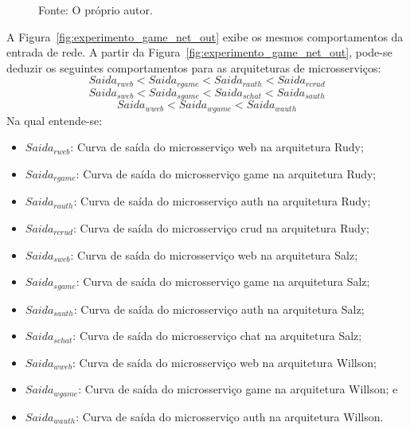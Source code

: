 \begin{figure}[htb!]
    Fonte: O próprio autor.
\end{figure}

A Figura~\ref{fig:experimento_game_net_out} exibe os mesmos comportamentos da entrada de rede.
%
A partir da Figura~\ref{fig:experimento_game_net_out}, pode-se deduzir os seguintes comportamentos para as arquiteturas de microsserviços:
\vspace{-0.3cm}
$$
     Saida_{rweb} < Saida_{rgame} < Saida_{rauth} < Saida_{rcrud}
$$
$$
     Saida_{sweb} < Saida_{sgame} < Saida_{schat} < Saida_{sauth}
$$
$$
     Saida_{wweb} < Saida_{wgame} < Saida_{wauth}
$$
\vspace{-0.3cm}
Na qual entende-se:
\vspace{-0.3cm}
\begin{itemize}
 \item $Saida_{rweb}$: Curva de saída do microsserviço web na arquitetura Rudy;
 \item $Saida_{rgame}$: Curva de saída do microsserviço game na arquitetura Rudy;
 \item $Saida_{rauth}$: Curva de saída do microsserviço auth na arquitetura Rudy;
 \item $Saida_{rcrud}$: Curva de saída do microsserviço crud na arquitetura Rudy;
  \item $Saida_{sweb}$: Curva de saída do microsserviço web na arquitetura Salz;
 \item $Saida_{sgame}$: Curva de saída do microsserviço game na arquitetura Salz;
 \item $Saida_{sauth}$: Curva de saída do microsserviço auth na arquitetura Salz;
 \item $Saida_{schat}$: Curva de saída do microsserviço chat na arquitetura Salz;
 \item $Saida_{wweb}$: Curva de saída do microsserviço web na arquitetura Willson;
 \item $Saida_{wgame}$: Curva de saída do microsserviço game na arquitetura Willson; e
 \item $Saida_{wauth}$: Curva de saída do microsserviço auth na arquitetura Willson.
\end{itemize}

